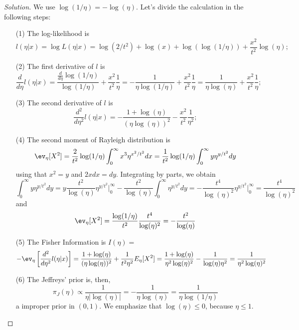 \begin{proof}[Solution] We use $\log(1/\eta) = -\log(\eta)$. Let's divide the calculation in the following steps:
    \begin{enumerate}
        \item[(1)] The log-likelihood is
         $$l(\eta|x) = \log L(\eta|x) = \log(2/t^2) + \log(x) +
        \log(\log(1/\eta)) + \frac{x^2}{t^2}\log(\eta);$$
        \item[(2)] The first derivative of $l$ is $$\frac{d}{d\eta} l(\eta|x)
        = \frac{\frac{d}{d\eta}\log(1/\eta)}{\log(1/\eta)} +
        \frac{x^2}{t^2}\frac{1}{\eta} = -\frac{1}{\eta\log(1/\eta)} +
        \frac{x^2}{t^2}\frac{1}{\eta} = \frac{1}{\eta\log(\eta)} +
        \frac{x^2}{t^2}\frac{1}{\eta};$$
        \item[(3)] The second derivative of $l$ is $$\frac{d^2}{d\eta^2}
        l(\eta|x)=-\frac{1 + \log(\eta)}{(\eta\log(\eta))^2} -
        \frac{x^2}{t^2}\frac{1}{\eta^2};$$
        \item[(4)] The second moment of Rayleigh distribution is
        $$\ev_{\eta}[X^2] = \frac{2}{t^2}\log(1/\eta)\int_0^{\infty}
        x^3\eta^{x^2/t^2} dx = \frac{1}{t^2}\log(1/\eta)\int_0^{\infty}
        y\eta^{y/t^2} dy$$
        using that $x^2 = y$ and $2x dx = dy$. Integrating by parts, we obtain 
        $$
        \int_0^{\infty} y\eta^{y/t^2} dy = y\frac{t^2}{\log(\eta)}\eta^{y/t^2}\bigg|_0^{\infty} - \frac{t^2}{\log(\eta)}\int_0^{\infty} \eta^{y/t^2} dy = -\frac{t^4}{\log(\eta)^2}\eta^{y/t^2}\bigg|_0^{\infty} = \frac{t^4}{\log(\eta)^2}
        $$
        and 
        $$\ev_{\eta}[X^2] =\frac{\log(1/\eta)}{t^2}\frac{t^4}{\log(\eta)^2} = -\frac{t^2}{\log(\eta)}$$
        \item[(5)] The Fisher Information is $I(\eta)=$ $$-\ev_{\eta}\left[\frac{d^2}{d\eta^2}
        l(\eta|x)\right] = \frac{1 + \log(\eta)}{(\eta\log(\eta))^2} +
        \frac{1}{t^2\eta^2}E_{\eta}[X^2] = \frac{1 + \log(\eta)}{\eta^2\log(\eta)^2} -
        \frac{1}{\log(\eta)\eta^2} = \frac{1}{\eta^2\log(\eta)^2}$$
        \item[(6)] The Jeffreys' prior is, then, $$\pi_J(\eta) \propto
        \frac{1}{\eta|\log(\eta)|} = -\frac{1}{\eta\log(\eta)} =
        \frac{1}{\eta\log(1/\eta)}$$
        a improper prior in $(0,1)$. We emphasize that $\log(\eta) \le 0$,
        because $\eta \le 1$. 
    \end{enumerate}
\end{proof}